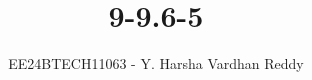 \documentclass[journal]{IEEEtran}
\begin{document}

\vspace{3cm}

\title{9-9.6-5}
\author{EE24BTECH11063 - Y. Harsha Vardhan Reddy}
 \maketitle
{\let\newpage\relax\maketitle}

\renewcommand{\thefigure}{\theenumi}
\renewcommand{\thetable}{\theenumi}
\setlength{\intextsep}{10pt} %


\renewcommand{\thetable}{\theenumi}
\end{document}
